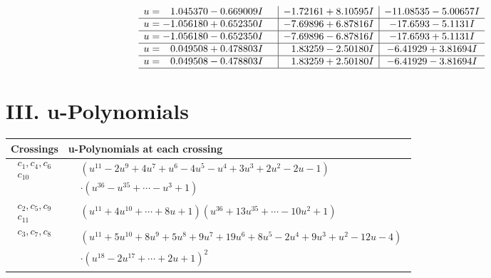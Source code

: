 \documentclass[1p]{elsarticle_modified}
\theoremstyle{definition}
\begin{document}
$$\begin{array}{c|c|c}
\begin{aligned}
u &= \phantom{-}1.045370 - 0.669009 I\end{aligned}
 & -1.72161 + 8.10595 I & -11.08535 - 5.00657 I \\ \hline\begin{aligned}
u &= -1.056180 + 0.652350 I\end{aligned}
 & -7.69896 + 6.87816 I & -17.6593 - 5.1131 I \\ \hline\begin{aligned}
u &= -1.056180 - 0.652350 I\end{aligned}
 & -7.69896 - 6.87816 I & -17.6593 + 5.1131 I \\ \hline\begin{aligned}
u &= \phantom{-}0.049508 + 0.478803 I\end{aligned}
 & \phantom{-}1.83259 - 2.50180 I & -6.41929 + 3.81694 I \\ \hline\begin{aligned}
u &= \phantom{-}0.049508 - 0.478803 I\end{aligned}
 & \phantom{-}1.83259 + 2.50180 I & -6.41929 - 3.81694 I\\
 \hline 
 \end{array}$$\newpage
\newpage\renewcommand{\arraystretch}{1}
\centering \section*{ III. u-Polynomials}
\begin{tabular}{m{50pt}|m{274pt}}
Crossings & \hspace{64pt}u-Polynomials at each crossing \\
\hline $$\begin{aligned}c_{1},c_{4},c_{6}\\c_{10}\end{aligned}$$&$\begin{aligned}
&(u^{11}-2 u^9+4 u^7+u^6-4 u^5- u^4+3 u^3+2 u^2-2 u-1)\\
&\cdot(u^{36}- u^{35}+\cdots- u^3+1)
\end{aligned}$\\
\hline $$\begin{aligned}c_{2},c_{5},c_{9}\\c_{11}\end{aligned}$$&$\begin{aligned}
&(u^{11}+4 u^{10}+\cdots+8 u+1)(u^{36}+13 u^{35}+\cdots-10 u^2+1)
\end{aligned}$\\
\hline $$\begin{aligned}c_{3},c_{7},c_{8}\end{aligned}$$&$\begin{aligned}
&(u^{11}+5 u^{10}+8 u^9+5 u^8+9 u^7+19 u^6+8 u^5-2 u^4+9 u^3+u^2-12 u-4)\\
&\cdot(u^{18}-2 u^{17}+\cdots+2 u+1)^{2}
\end{aligned}$\\
\hline
\end{tabular}\newpage\renewcommand{\arraystretch}{1}
\end{document}
